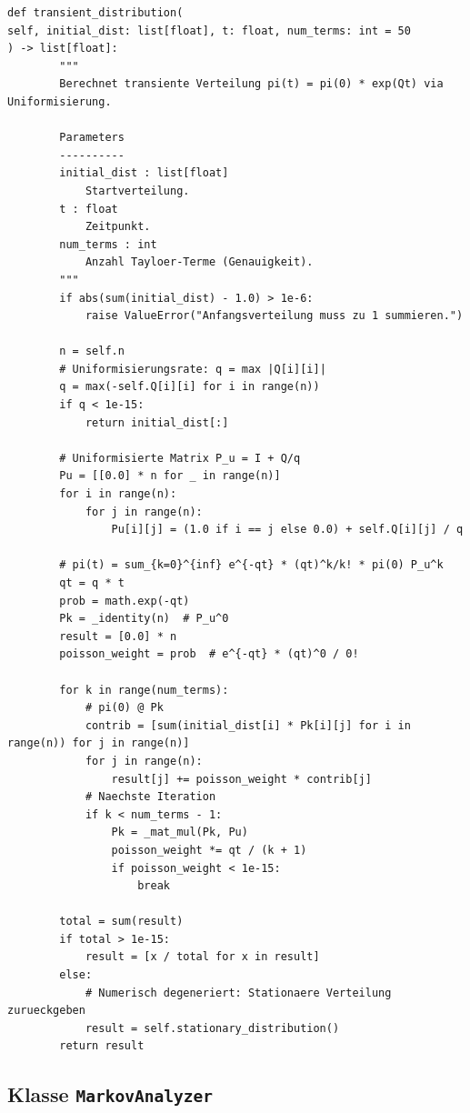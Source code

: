 ﻿\documentclass[a4paper,12pt]{report}
\theoremstyle{definition}
\begin{document}
\begin{lstlisting}[style=python, caption={Uniformisierungsverfahren für die transiente Verteilung (Auszug)}, label=lst:uniformization]
def transient_distribution(
self, initial_dist: list[float], t: float, num_terms: int = 50
) -> list[float]:
        """
        Berechnet transiente Verteilung pi(t) = pi(0) * exp(Qt) via Uniformisierung.

        Parameters
        ----------
        initial_dist : list[float]
            Startverteilung.
        t : float
            Zeitpunkt.
        num_terms : int
            Anzahl Tayloer-Terme (Genauigkeit).
        """
        if abs(sum(initial_dist) - 1.0) > 1e-6:
            raise ValueError("Anfangsverteilung muss zu 1 summieren.")

        n = self.n
        # Uniformisierungsrate: q = max |Q[i][i]|
        q = max(-self.Q[i][i] for i in range(n))
        if q < 1e-15:
            return initial_dist[:]

        # Uniformisierte Matrix P_u = I + Q/q
        Pu = [[0.0] * n for _ in range(n)]
        for i in range(n):
            for j in range(n):
                Pu[i][j] = (1.0 if i == j else 0.0) + self.Q[i][j] / q

        # pi(t) = sum_{k=0}^{inf} e^{-qt} * (qt)^k/k! * pi(0) P_u^k
        qt = q * t
        prob = math.exp(-qt)
        Pk = _identity(n)  # P_u^0
        result = [0.0] * n
        poisson_weight = prob  # e^{-qt} * (qt)^0 / 0!

        for k in range(num_terms):
            # pi(0) @ Pk
            contrib = [sum(initial_dist[i] * Pk[i][j] for i in range(n)) for j in range(n)]
            for j in range(n):
                result[j] += poisson_weight * contrib[j]
            # Naechste Iteration
            if k < num_terms - 1:
                Pk = _mat_mul(Pk, Pu)
                poisson_weight *= qt / (k + 1)
                if poisson_weight < 1e-15:
                    break

        total = sum(result)
        if total > 1e-15:
            result = [x / total for x in result]
        else:
            # Numerisch degeneriert: Stationaere Verteilung zurueckgeben
            result = self.stationary_distribution()
        return result
\end{lstlisting}

\subsection{Klasse \texttt{MarkovAnalyzer}}
\end{document}
